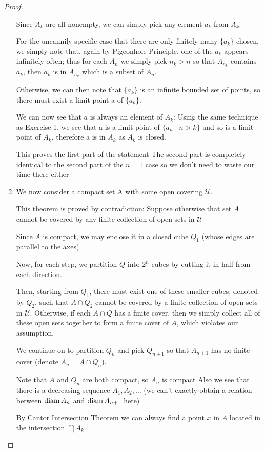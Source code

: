 \begin{proof}
\begin{enumerate}[label=(\alph*)]
Since $A_k$ are all nonempty, we can simply pick any element $a_k$ from $A_k$.

For the uncannily specific case that there are only finitely many $\{a_k\}$ chosen, we simply note that, again by Pigeonhole Principle, one of the $a_k$ appears infinitely often; thus for each $A_n$ we simply pick $n_k>n$ so that $A_{n_k}$ contains $a_k$, then $a_k$ is in $A_{n_k}$ which is a subset of $A_n$.

Otherwise, we can then note that $\{a_k\}$ is an infinite bounded set of points, so there must exist a limit point a of $\{a_k\}$.

We can now see that $a$ is always an element of $A_k$:
Using the same technique as Exercise 1, we see that a is a limit point of $\{a_n \mid n>k\}$ and so is a limit point of $A_k$, therefore a is in $A_k$ as $A_k$ is closed.

This proves the first part of the statement
The second part is completely identical to the second part of the $n=1$ case so we don't need to waste our time there either

\item We now consider a compact set A with some open covering $\mathscr{U}$.

This theorem is proved by contradiction: 
Suppose otherwise that set $A$ cannot be covered by any finite collection of open sets in $\mathscr{U}$

Since $A$ is compact, we may enclose it in a closed cube $Q_1$ (whose edges are parallel to the axes)

Now, for each step, we partition $Q$ into $2^n$ cubes by cutting it in half from each direction.

Then, starting from $Q_1$, there must exist one of these smaller cubes, denoted by $Q_2$, such that $A \cap Q_2$ cannot be covered by a finite collection of open sets in $\mathscr{U}$. 
Otherwise, if each $A \cap Q$ has a finite cover, then we simply collect all of these open sets together to form a finite cover of $A$, which violates our assumption.

We continue on to partition $Q_n$ and pick $Q_{n+1}$ so that $A_{n+1}$ has no finite cover (denote $A_n = A \cap Q_n$).

Note that $A$ and $Q_n$ are both compact, so $A_n$ is compact
Also we see that there is a decreasing sequence $A_1,A_2,\dots$
(we can't exactly obtain a relation between $\operatorname{diam} A_n$ and $\operatorname{diam} A_{n+1}$ here)

By Cantor Intersection Theorem we can always find a point $x$ in $A$ located in the intersection $\bigcap A_k$.


\end{enumerate}
\end{proof}
